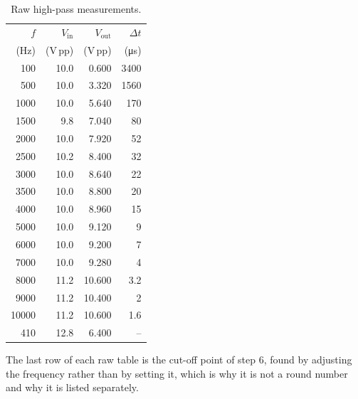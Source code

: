 \documentclass[11pt]{article}
\begin{document}
\begin{minipage}[t]{0.48\linewidth}
\begin{table}[H]
    \centering\small
    \caption{Raw high-pass measurements.}
    \label{tab:rawhp}
    \begin{tabular}{rrrr}
        \toprule
        $f$ & $V_{\text{in}}$ & $V_{\text{out}}$ & $\Delta t$ \\
        (\unit{\hertz}) & (\unit{\volt}\,pp) & (\unit{\volt}\,pp) & (\unit{\micro\second}) \\
        \midrule
          100 & 10.0 & 0.600 & 3400 \\
          500 & 10.0 & 3.320 & 1560 \\
         1000 & 10.0 & 5.640 & 170 \\
         1500 & 9.8 & 7.040 & 80 \\
         2000 & 10.0 & 7.920 & 52 \\
         2500 & 10.2 & 8.400 & 32 \\
         3000 & 10.0 & 8.640 & 22 \\
         3500 & 10.0 & 8.800 & 20 \\
         4000 & 10.0 & 8.960 & 15 \\
         5000 & 10.0 & 9.120 & 9 \\
         6000 & 10.0 & 9.200 & 7 \\
         7000 & 10.0 & 9.280 & 4 \\
         8000 & 11.2 & 10.600 & 3.2 \\
         9000 & 11.2 & 10.400 & 2 \\
        10000 & 11.2 & 10.600 & 1.6 \\
        \midrule
        410 & 12.8 & 6.400 & -- \\
        \bottomrule
    \end{tabular}
\end{table}
\end{minipage}

\vspace{1em}

The last row of each raw table is the cut-off point of step 6, found by adjusting
the frequency rather than by setting it, which is why it is not a round number
and why it is listed separately.
\end{document}
